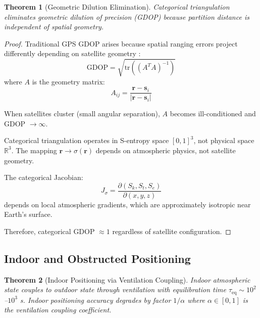 \documentclass[twocolumn,10pt,a4paper]{article}
\newtheorem{theorem}{Theorem}[section]
\theoremstyle{definition}
\theoremstyle{remark}
\begin{document}
\begin{theorem}[Geometric Dilution Elimination]
\label{thm:gdop}
Categorical triangulation eliminates geometric dilution of precision (GDOP) because partition distance is independent of spatial geometry.
\end{theorem}

\begin{proof}
Traditional GPS GDOP arises because spatial ranging errors project differently depending on satellite geometry \cite{langley1999dilution}:
\begin{equation}
    \text{GDOP} = \sqrt{\text{tr}((A^T A)^{-1})}
\end{equation}
where $A$ is the geometry matrix:
\begin{equation}
    A_{ij} = \frac{\mathbf{r} - \mathbf{s}_i}{|\mathbf{r} - \mathbf{s}_i|}
\end{equation}

When satellites cluster (small angular separation), $A$ becomes ill-conditioned and GDOP $\to \infty$.

Categorical triangulation operates in S-entropy space $[0,1]^3$, not physical space $\mathbb{R}^3$. The mapping $\mathbf{r} \to \sigma(\mathbf{r})$ depends on atmospheric physics, not satellite geometry.

The categorical Jacobian:
\begin{equation}
    J_{\sigma} = \frac{\partial(S_k, S_t, S_e)}{\partial(x, y, z)}
\end{equation}
depends on local atmospheric gradients, which are approximately isotropic near Earth's surface.

Therefore, categorical GDOP $\approx 1$ regardless of satellite configuration.
\end{proof}

\subsection{Indoor and Obstructed Positioning}

\begin{theorem}[Indoor Positioning via Ventilation Coupling]
\label{thm:indoor}
Indoor atmospheric state couples to outdoor state through ventilation with equilibration time $\tau_{\text{eq}} \sim 10^2$--$10^3$ s. Indoor positioning accuracy degrades by factor $1/\alpha$ where $\alpha \in [0,1]$ is the ventilation coupling coefficient.
\end{theorem}
\end{document}
